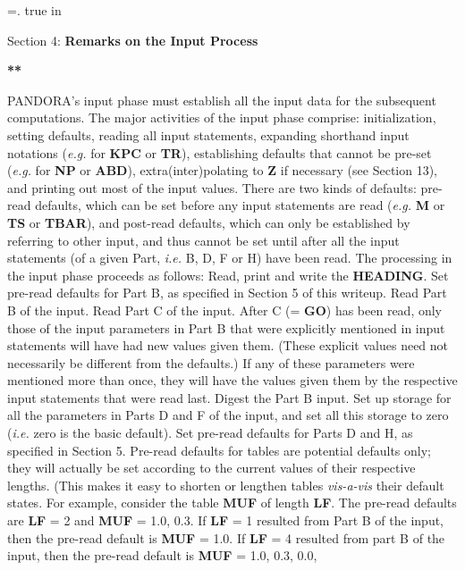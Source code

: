 %
\newtoks\footline \footline={\hss{}.\folio\hss}
\top
{} true in
\centerline{Section 4: {\bf Remarks on the Input Process}}
\blankline
\blankline
\centerline{\bf ***}
\blankline
\blankline
PANDORA's input phase must establish all the input data for the subsequent
computations. The major activities of the input phase comprise: initialization,
setting defaults, reading all input statements, expanding shorthand input
notations ({\it e.g.} for {\bf KPC} or {\bf TR}), establishing defaults that
cannot be pre-set ({\it e.g.} for {\bf NP} or {\bf ABD}), extra(inter)polating
to {\bf Z} if necessary (see Section 13), and printing out most of the input
values.
\blankline
There are two kinds of defaults: pre-read defaults, which can be set before
any input statements are read ({\it e.g.} {\bf M} or {\bf TS} or {\bf TBAR}),
and post-read defaults, which can only be established by referring to other
input, and thus cannot be set until after all the input statements (of a
given Part, {\it i.e.} B, D, F or H) have been read.
\blankline
The processing in the input phase proceeds as follows:
\blankline
\bull Read, print and write the {\bf HEADING}.
\space
\bull Set pre-read defaults for Part B, as specified in Section 5 of this
writeup.
\space
\bull Read Part B of the input.
\space
\bull Read Part C of the input. After C (= {\bf GO}) has been read, only those
of the input parameters in Part B that were explicitly mentioned in input
statements will have had new values given them. (These explicit values need
not necessarily be different from the defaults.) If any of these parameters
were mentioned more than once, they will have the values given them by the
respective input statements that were read last.
\space
\bull Digest the Part B input.
\ej
\bull Set up storage for all the parameters in Parts D and F of the input,
and set all this storage to zero ({\it i.e.} zero is the basic default).
\space
\bull Set pre-read defaults for Parts D and H, as specified in Section 5.
Pre-read defaults for tables are potential defaults
only; they will actually be set according to the current
values of their respective lengths.
(This makes it easy to shorten or lengthen tables {\it vis-a-vis}
their default states. For example, consider the table {\bf MUF} of length
{\bf LF}. The pre-read defaults are {\bf LF} = 2 and
{\bf MUF} = 1.0, 0.3. If {\bf LF} = 1 resulted from Part B of the input,
then the pre-read default is {\bf MUF} = 1.0. If {\bf LF} = 4 resulted from
part B of the input, then the pre-read default is {\bf MUF} = 1.0, 0.3, 0.0, 
